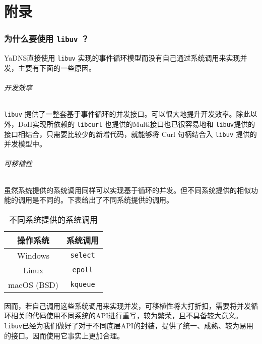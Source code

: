 \part{附录}

\section{为什么要使用 \lstinline{libuv} ？}
\label{sec:why-libuv}

YaDNS直接使用 \lstinline{libuv} 实现的事件循环模型而没有自己通过系统调用来实现并发，主要有下面的一些原因。

\paragraph{开发效率}

\lstinline{libuv} 提供了一整套基于事件循环的并发接口。可以很大地提升开发效率。除此以外，DoH实现所依赖的 \lstinline{libcurl} 也提供的Multi接口也已很容易地和 \lstinline{libuv}提供的接口相结合，只需要比较少的新增代码，就能够将 Curl 句柄结合入 \lstinline{libuv} 提供的并发模型中。

\paragraph{可移植性}

虽然系统提供的系统调用同样可以实现基于循环的并发。但不同系统提供的相似功能的调用是不同的。下表给出了不同系统提供的调用。

\begin{table}[h]
  \centering
  \begin{tabular}{cc}
    \toprule
    操作系统 & 系统调用 \\
    \midrule
    Windows & \texttt{select} \\
    Linux & \texttt{epoll} \\
    macOS (BSD) & \texttt{kqueue} \\
    \bottomrule
  \end{tabular}
  \caption{不同系统提供的系统调用}
\end{table}

因而，若自己调用这些系统调用来实现并发，可移植性将大打折扣，需要将并发循环相关的代码使用不同系统的API进行重写，较为繁荣，且不具备较大意义。\lstinline{libuv}已经为我们做好了对于不同底层API的封装，提供了统一、成熟、较为易用的接口。因而使用它事实上更加合理。

